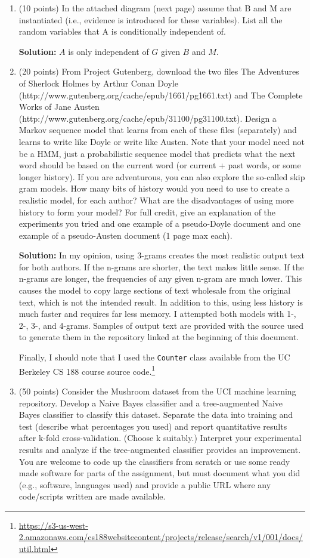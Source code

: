 \documentclass[11pt]{article}
\begin{document}
\begin{enumerate}
\item (10 points) In the attached diagram (next page) assume that B and M are instantiated (i.e., evidence is introduced for these variables). List all the random variables that A is conditionally independent of.

\textbf{Solution:} $A$ is only independent of $G$ given $B$ and $M$.

\item (20 points) From Project Gutenberg, download the two files The Adventures of Sherlock Holmes by Arthur Conan Doyle (http://www.gutenberg.org/cache/epub/1661/pg1661.txt) and The Complete Works of Jane Austen (http://www.gutenberg.org/cache/epub/31100/pg31100.txt). Design a Markov sequence model that learns from each of these files (separately) and learns to write like Doyle or write like Austen. Note that your model need not be a HMM, just a probabilistic sequence model that predicts what the next word should be based on the current word (or current + past words, or some longer history). If you are adventurous, you can also explore the so-called skip gram models. How many bits of history would you need to use to create a realistic model, for each author? What are the disadvantages of using more history to form your model? For full credit, give an explanation of the experiments you tried and one example of a pseudo-Doyle document and one example of a pseudo-Austen document (1 page max each).

\textbf{Solution:} In my opinion, using 3-grams creates the most realistic output text for both authors. If the n-grams are shorter, the text makes little sense. If the n-grams are longer, the frequencies of any given n-gram are much lower. This causes the model to copy large sections of text wholesale from the original text, which is not the intended result. In addition to this, using less history is much faster and requires far less memory. I attempted both models with 1-, 2-, 3-, and 4-grams. Samples of output text are provided with the source used to generate them in the repository linked at the beginning of this document.

Finally, I should note that I used the \verb|Counter| class available from the UC Berkeley CS 188 course source code.\footnote{\url{https://s3-us-west-2.amazonaws.com/cs188websitecontent/projects/release/search/v1/001/docs/util.html}}

\item (50 points) Consider the Mushroom dataset from the UCI machine learning repository. Develop a Naive Bayes classifier and a tree-augmented Naive Bayes classifier to classify this dataset. Separate the data into training and test (describe what percentages you used) and report quantitative results after k-fold cross-validation. (Choose k suitably.) Interpret your experimental results and analyze if the tree-augmented classifier provides an improvement. You are welcome to code up the classifiers from scratch or use some ready made software for parts of the assignment, but must document what you did (e.g., software, languages used) and provide a public URL where any code/scripts written are made available.


\end{enumerate}
\end{document}
